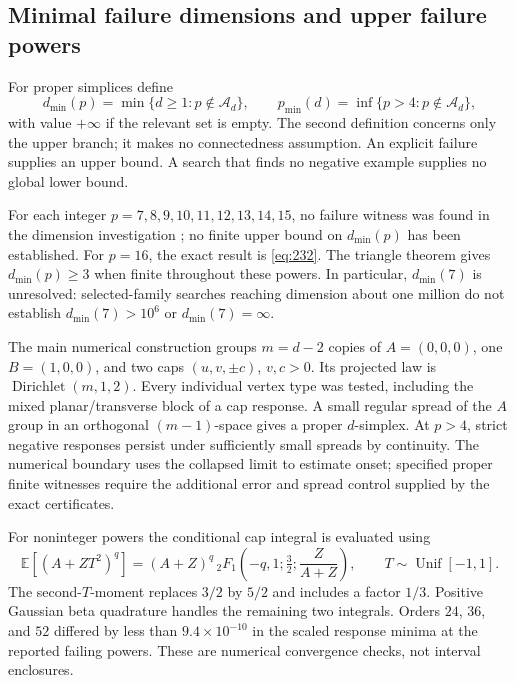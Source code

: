 \documentclass[11pt]{article}
\theoremstyle{definition}
\newcommand{\E}{\mathbb E}
\newcommand{\Dir}{\operatorname{Dirichlet}}
\begin{document}
\subsection{Minimal failure dimensions and upper failure powers}
\label{sec:dimensionprofile}
For proper simplices define
\[
 d_{\min}(p)=\min\{d\ge1:p\notin\mathcal A_d\},\qquad
 p_{\min}(d)=\inf\{p>4:p\notin\mathcal A_d\},
\]
with value $+\infty$ if the relevant set is empty. The second definition
concerns only the upper branch; it makes no connectedness assumption.
An explicit failure supplies an upper bound. A search that finds no
negative example supplies no global lower bound.

For each integer $p=7,8,9,10,11,12,13,14,15$, no failure witness was
found in the dimension investigation \cite{DimensionProfile}; no finite
upper bound on $d_{\min}(p)$ has been established. For $p=16$, the exact
result is \eqref{eq:232}. The triangle theorem gives $d_{\min}(p)\ge3$
when finite throughout these powers. In particular, $d_{\min}(7)$ is
unresolved: selected-family searches reaching dimension about one million
do not establish $d_{\min}(7)>10^6$ or $d_{\min}(7)=\infty$.

The main numerical construction groups $m=d-2$ copies of $A=(0,0,0)$,
one $B=(1,0,0)$, and two caps $(u,v,\pm c)$, $v,c>0$. Its projected law
is $\Dir(m,1,2)$. Every individual vertex type was tested, including
the mixed planar/transverse block of a cap response. A small regular
spread of the $A$ group in an orthogonal $(m-1)$-space gives a proper
$d$-simplex. At $p>4$, strict negative responses persist under sufficiently
small spreads by continuity. The numerical boundary uses the collapsed
limit to estimate onset; specified proper finite witnesses require the
additional error and spread control supplied by the exact certificates.

For noninteger powers the conditional cap integral is evaluated using
\[
 \E[(A+ZT^2)^q]=(A+Z)^q\,
 {}_2F_1\left(-q,1;\tfrac32;\frac Z{A+Z}\right),
 \qquad T\sim\operatorname{Unif}[-1,1].
\]
The second-$T$-moment replaces $3/2$ by $5/2$ and includes a factor $1/3$.
Positive Gaussian beta quadrature handles the remaining two integrals.
Orders $24$, $36$, and $52$ differed by less than $9.4\times10^{-10}$
in the scaled response minima at the reported failing powers. These are
numerical convergence checks, not interval enclosures.
\end{document}

